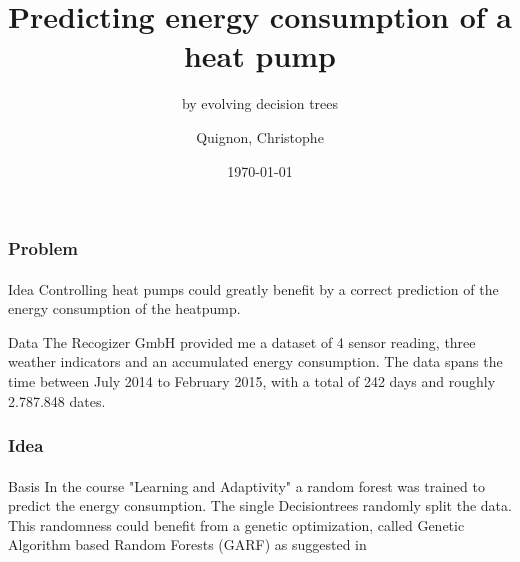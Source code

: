 \documentclass{beamer}
\begin{document}
\title{Predicting energy consumption of a heat pump}
\subtitle{by evolving decision trees}
\author{
  Quignon, Christophe \\
} 
\date{\today}

\begin{frame}
\titlepage{}
\end{frame}

\begin{frame}[fragile]
\frametitle{Problem}
\framesubtitle{}

\begin{block}{Idea}
Controlling heat pumps could greatly benefit by a correct prediction of the energy consumption of the heatpump.
\end{block}
\hbox{}

\begin{block}{Data}
The Recogizer GmbH provided me a dataset of 4 sensor reading, three weather indicators and an accumulated energy consumption. The data spans the time between July 2014 to February 2015, with a total of 242 days and roughly 2.787.848 dates.
\end{block}
\end{frame}


\begin{frame}[fragile]
\frametitle{Idea}
\framesubtitle{}


\begin{block}{Basis}
In the course "Learning and Adaptivity" a random forest was trained to predict the energy consumption. The single Decisiontrees randomly split the data.\\
This randomness could benefit from a genetic optimization, called Genetic Algorithm based Random Forests (GARF) as suggested in \cite{bader2012garf}
\end{block}


\end{frame}
\end{document}

